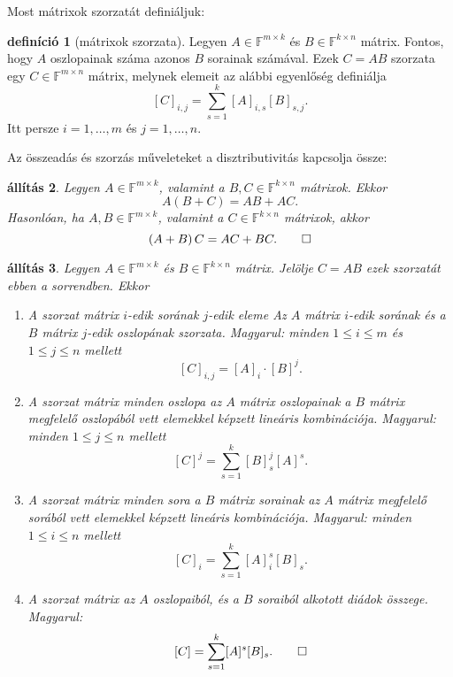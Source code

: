 \documentclass[9pt, showtrims]{memoir}
\theoremstyle{plain}
\newtheorem{proposition}{állítás}[section]
\theoremstyle{remark}
\theoremstyle{definition}
\newtheorem{definition}[proposition]{definíció}
\renewcommand{\mathbf}{\mathbb}
\begin{document}
Most mátrixok szorzatát definiáljuk:
\begin{definition}[mátrixok szorzata]
    Legyen $A\in\mathbf{F}^{m\times k}$ és $B\in\mathbf{F}^{k\times n}$ mátrix.
    Fontos, hogy $A$ oszlopainak száma azonos $B$ sorainak számával.
    Ezek $C=AB$ szorzata egy $C\in\mathbf{F}^{m\times n}$ mátrix,
    melynek elemeit az alábbi egyenlőség definiálja
    \[
        [C]_{i,j}=\sum_{s=1}^k[A]_{i,s}[B]_{s,j}.
    \]
    Itt persze $i=1,\dots,m$ és $j=1,\dots,n.$
\end{definition}
Az összeadás és szorzás műveleteket a disztributivitás kapcsolja össze:
\begin{proposition}
    Legyen $A\in\mathbf{F}^{m\times k}$, valamint a $B,C\in\mathbf{F}^{k\times n}$ mátrixok.
    Ekkor
    \begin{displaymath}
        A\left( B+C \right)=AB+AC.
    \end{displaymath}
    Hasonlóan,
    ha $A,B\in\mathbf{F}^{m\times k}$, valamint a $C\in\mathbf{F}^{k\times n}$ mátrixok,
    akkor
    \begin{displaymath}
        \left( A+B \right)C=AC+BC.\qedhere
    \end{displaymath}
\end{proposition}
\begin{proposition}
    Legyen $A\in\mathbf{F}^{m\times k}$ és $B\in\mathbf{F}^{k\times n}$ mátrix.
    Jelölje $C=AB$ ezek szorzatát ebben a sorrendben.
    Ekkor
    \begin{enumerate}
        \item A szorzat mátrix $i$-edik sorának $j$-edik eleme Az $A$ mátrix $i$-edik sorának és a $B$ mátrix $j$-edik
            oszlopának szorzata. Magyarul: minden $1\leq i\leq m$ és $1\leq j \leq n$ mellett
            \[
                [C]_{i,j}=[A]_i\cdot [B]^j.
            \]
        \item
            A szorzat mátrix minden oszlopa az $A$ mátrix oszlopainak a $B$ mátrix megfelelő oszlopából vett elemekkel képzett
            lineáris kombinációja.
            Magyarul: minden $1\leq j\leq n$ mellett
            \[
                [C]^j=\sum_{s=1}^k[B]_s^j[A]^s.
            \]
        \item
            A szorzat mátrix minden sora a $B$ mátrix sorainak az $A$ mátrix megfelelő sorából vett elemekkel képzett
            lineáris kombinációja.
            Magyarul: minden $1\leq i\leq n$ mellett
            \[
                [C]_i=\sum_{s=1}^k[A]_i^s[B]_s.
            \]
        \item
            A szorzat mátrix az $A$ oszlopaiból, és a $B$ soraiból alkotott diádok összege.
            Magyarul:
            \[
                [C]=\sum_{s=1}^k[A]^s[B]_s.\qedhere
            \]
    \end{enumerate}
\end{proposition}
\end{document}

